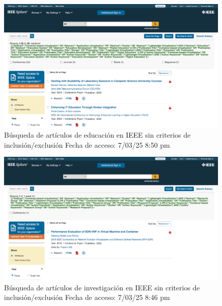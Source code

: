 \begin{figure}[htbp]
    \centering
    \includegraphics[width=\textwidth,keepaspectratio]{apendices/BD/sin-criterios/IEEE-ed.png}
    \caption{Búsqueda de artículos de educación en IEEE sin criterios de inclusión/exclusión
    Fecha de acceso: 7/03/25 8:50 pm
    }\label{fig:busqueda4}
\end{figure}
\FloatBarrier

\begin{figure}[htbp]
    \centering
    \includegraphics[width=\textwidth,keepaspectratio]{apendices/BD/sin-criterios/IEEE-inv.png}
    \caption{Búsqueda de artículos de investigación en IEEE sin criterios de inclusión/exclusión
    Fecha de acceso: 7/03/25 8:46 pm
    }\label{fig:busqueda5}
\end{figure}
\FloatBarrier

